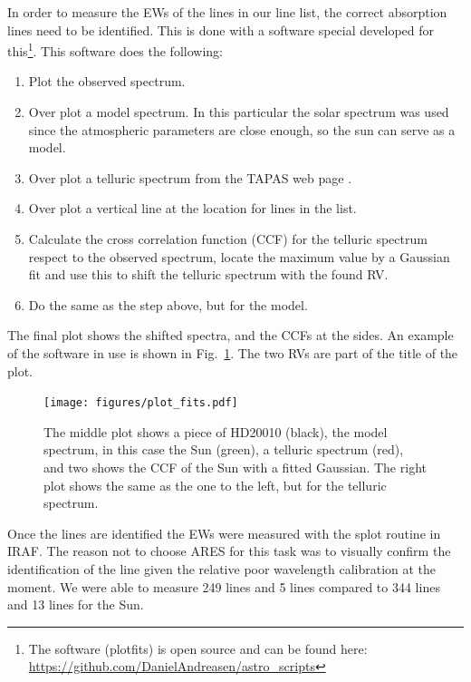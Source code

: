 \documentclass{aa}
\begin{document}
In order to measure the EWs of the lines in our line list, the
correct absorption lines need to be identified. This is done
with a software special developed for this\footnote{The software
(plot\textunderscore{}fits) is open source and can be found here:
\url{https://github.com/DanielAndreasen/astro_scripts}}. This software
does the following:
\begin{enumerate}
    \item Plot the observed spectrum.
    \item Over plot a model spectrum. In this particular the solar spectrum was
        used since the atmospheric parameters are close enough, so the sun can
        serve as a model.
    \item Over plot a telluric spectrum from the TAPAS web page \citep{Bertaux2014}.
    \item Over plot a vertical line at the location for lines in the list.
    \item Calculate the cross correlation function (CCF) for the telluric spectrum
        respect to the observed spectrum, locate the maximum value by a Gaussian fit
        and use this to shift the telluric spectrum with the found RV.
    \item Do the same as the step above, but for the model.
\end{enumerate}
The final plot shows the shifted spectra, and the CCFs at the sides. An example
of the software in use is shown in Fig.~\ref{fig:plot_fits}. The two RVs are
part of the title of the plot.



\begin{figure}[tbp!]
    \centering
    \texttt{[image: figures/plot\_fits.pdf]}
    \caption{The middle plot shows a piece of HD20010 (black), the model
    spectrum, in this case the Sun (green), a telluric spectrum (red), and two
    shows the CCF of the Sun with a fitted Gaussian. The right plot shows the
    same as the one to the left, but for the telluric spectrum.}
    \label{fig:plot_fits}
\end{figure}

Once the lines are identified the EWs were measured with the splot
routine in IRAF. The reason not to choose ARES for this task was to
visually confirm the identification of the line given the relative poor
wavelength calibration at the moment. We were able to measure 249 
lines and 5  lines compared to 344  lines and 13  lines for
the Sun.
\end{document}
